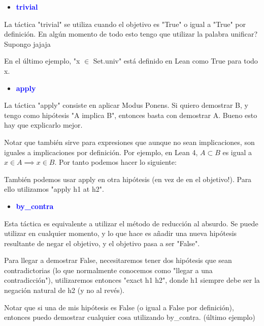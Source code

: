 \documentclass{article}
\begin{document}

\begin{itemize}
  \item \textbf{\textcolor{blue}{trivial}}
\end{itemize}

La táctica "trivial" se utiliza cuando el objetivo es "True" o igual a "True" por definición. En algún momento de todo esto tengo que utilizar la palabra unificar? Supongo jajaja


En el último ejemplo, "x $\in$ Set.univ" está definido en Lean como True para todo x.

\begin{itemize}
  \item \textbf{\textcolor{blue}{apply}}
\end{itemize}

La táctica "apply" consiste en aplicar Modus Ponens. Si quiero demostrar B, y tengo como hipótesis "A implica B", entonces basta con demostrar A. Bueno esto hay que explicarlo mejor.

Notar que también sirve para expresiones que aunque no sean implicaciones, son iguales a implicaciones por definición. Por ejemplo, en Lean 4, $A \subset B$ es igual a $x \in A \implies x \in B$. Por tanto podemos hacer lo siguiente:


También podemos usar apply en otra hipótesis (en vez de en el objetivo!). Para ello utilizamos "apply h1 at h2".


\begin{itemize}
  \item \textbf{\textcolor{blue}{by\_contra}}
\end{itemize}

Esta táctica es equivalente a utilizar el método de reducción al absurdo. Se puede utilizar en cualquier momento, y lo que hace es añadir una nueva hipótesis resultante de negar el objetivo, y el objetivo pasa a ser "False".

Para llegar a demostrar False, necesitaremos tener dos hipótesis que sean contradictorias (lo que normalmente conocemos como "llegar a una contradicción"), utilizaremos entonces "exact h1 h2", donde h1 siempre debe ser la negación natural de h2 (y no al revés).


Notar que si una de mis hipótesis es False (o igual a False por definición), entonces puedo demostrar cualquier cosa utilizando by\_contra. (último ejemplo)
\end{document}
